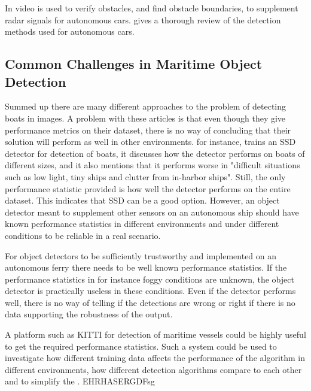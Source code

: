 \vspace{3mm}

In \citep{Wedel2007} video is used to verify obstacles, and find obstacle boundaries, to supplement radar signals for autonomous cars.\citep{Sun2006} gives a thorough review of the detection methods used for autonomous cars. 


\subsection{Common Challenges in Maritime Object Detection}
Summed up there are many different approaches to the problem of detecting boats in images. A problem with these articles is that even though they give performance metrics on their dataset, there is no way of concluding that their solution will perform as well in other environments. \citep{SSD_detection2018} for instance, trains an SSD detector for detection of boats, it discusses how the detector performs on boats of different sizes, and it also mentions that it performs worse in "difficult situations such as low light, tiny ships and clutter from in-harbor ships". Still, the only performance statistic provided is how well the detector performs on the entire dataset. This indicates that SSD can be a good option. However, an object detector meant to supplement other sensors on an autonomous ship should have known performance statistics in different environments and under different conditions to be reliable in a real scenario. 

\vspace{3mm}

For object detectors to be sufficiently trustworthy and implemented on an autonomous ferry there needs to be well known performance statistics. If the performance statistics in for instance foggy conditions are unknown, the object detector is practically useless in these conditions. Even if the detector performs well, there is no way of telling if the detections are wrong or right if there is no data supporting the robustness of the output.

\vspace{3mm}

A platform such as KITTI \citep{KITTI} for detection of maritime vessels could be highly useful to get the required performance statistics. Such a system could be used to investigate how different training data affects the performance of the algorithm in different environments, how different detection algorithms compare to each other and to simplify the . EHRHASERGDFsg

